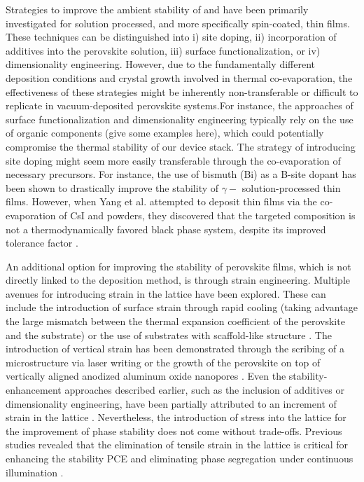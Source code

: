 Strategies to improve the ambient stability of  and  have been primarily investigated for solution processed, and more specifically spin-coated, thin films. These techniques can be distinguished into i)  site doping, ii) incorporation of additives into the perovskite solution, iii) surface functionalization, or iv) dimensionality engineering. However, due to the fundamentally different deposition conditions and crystal growth involved in thermal co-evaporation, the effectiveness of these strategies might be inherently non-transferable or difficult to replicate in vacuum-deposited perovskite systems.For instance, the approaches of surface functionalization and dimensionality engineering typically rely on the use of organic components (give some examples here), which could potentially compromise the thermal stability of our device stack. The strategy of introducing  site doping might seem more easily transferable through the co-evaporation of necessary precursors. For instance, the use of bismuth (Bi) as a B-site dopant has been shown to drastically improve the stability of $\gamma-$ solution-processed thin films. However, when Yang et al. attempted to deposit  thin films via the co-evaporation of CsI and  powders, they discovered that the targeted composition is not a thermodynamically favored black phase system, despite its improved tolerance factor \cite{Yang2021CanPhase}.


An additional option for improving the stability of perovskite films, which is not directly linked to the deposition method, is through strain engineering. Multiple avenues for introducing strain in the lattice have been explored. These can include the introduction of surface strain through rapid cooling (taking advantage the large mismatch between the thermal expansion coefficient of the perovskite and the substrate) or the use of substrates with scaffold-like structure \cite{Steele2019ThermalFilms, Chakrabarti2022Scaffold-EnforcedStability}. The introduction of vertical strain has been demonstrated through the scribing of a  microstructure via laser writing or the growth of the perovskite on top of vertically aligned anodized aluminum oxide nanopores \cite{Steele2022AnFilms, Ma2019Strain-MediatedGrowth}. Even the stability-enhancement approaches described earlier, such as the inclusion of additives or dimensionality engineering, have been partially attributed to an increment of strain in the lattice \cite{Steele2021TrojansPerovskite}. Nevertheless, the introduction of stress into the lattice for the improvement of phase stability does not come without trade-offs. Previous studies revealed that the elimination of tensile strain in the lattice is critical for enhancing the stability PCE and eliminating phase segregation under continuous illumination \cite{Rolston2018EngineeringStability, Xue2020RegulatingLayers}.

